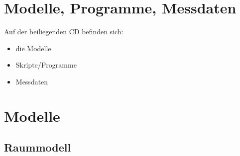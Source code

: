 \appendix
\chapter{Modelle, Programme, Messdaten}
\label{att:cd}
Auf der beiliegenden CD befinden sich:
\begin{itemize}
	\item die Modelle
	\item Skripte/Programme
	\item Messdaten
\end{itemize}

\newpage


\chapter{Modelle}
\section{Raummodell}
\label{att:raummod}

%
%
%
%
%
%
%
%
%
%
%
%
%
%
